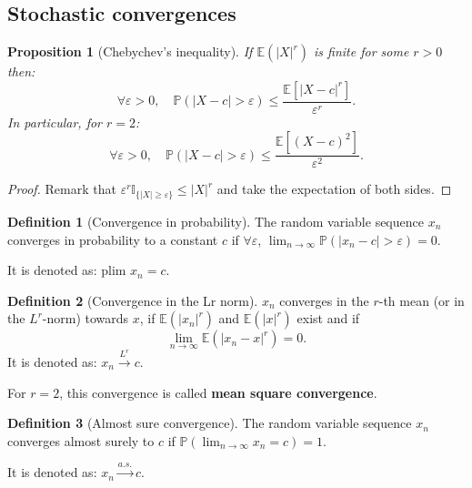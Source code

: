 \documentclass[
  12pt,
]{book}
\newtheorem{proposition}{Proposition}[chapter]
\theoremstyle{definition}
\newtheorem{definition}{Definition}[chapter]
\theoremstyle{definition}
\theoremstyle{definition}
\theoremstyle{definition}
\theoremstyle{remark}
\begin{document}
\hypertarget{stochastic-convergences}{%
\subsection{Stochastic convergences}\label{stochastic-convergences}}

\begin{proposition}[Chebychev's inequality]
\protect\hypertarget{prp:chebychev}{}\label{prp:chebychev}If \(\mathbb{E}(|X|^r)\) is finite for some \(r>0\) then:
\[
\forall \varepsilon > 0, \quad \mathbb{P}(|X - c|>\varepsilon) \le \frac{\mathbb{E}[|X - c|^r]}{\varepsilon^r}.
\]
In particular, for \(r=2\):
\[
\forall \varepsilon > 0, \quad \mathbb{P}(|X - c|>\varepsilon) \le \frac{\mathbb{E}[(X - c)^2]}{\varepsilon^2}.
\]
\end{proposition}

\begin{proof}
Remark that \(\varepsilon^r \mathbb{I}_{\{|X| \ge \varepsilon\}} \le |X|^r\) and take the expectation of both sides.
\end{proof}

\begin{definition}[Convergence in probability]
\protect\hypertarget{def:convergenceproba}{}\label{def:convergenceproba}The random variable sequence \(x_n\) converges in probability to a constant \(c\) if \(\forall \varepsilon\), \(\lim_{n \rightarrow \infty} \mathbb{P}(|x_n - c|>\varepsilon) = 0\).

It is denoted as: \(\mbox{plim } x_n = c\).
\end{definition}

\begin{definition}[Convergence in the Lr norm]
\protect\hypertarget{def:convergenceLr}{}\label{def:convergenceLr}\(x_n\) converges in the \(r\)-th mean (or in the \(L^r\)-norm) towards \(x\), if \(\mathbb{E}(|x_n|^r)\) and \(\mathbb{E}(|x|^r)\) exist and if
\[
\lim_{n \rightarrow \infty} \mathbb{E}(|x_n - x|^r) = 0.
\]
It is denoted as: \(x_n \overset{L^r}{\rightarrow} c\).

For \(r=2\), this convergence is called \textbf{mean square convergence}.
\end{definition}

\begin{definition}[Almost sure convergence]
\protect\hypertarget{def:convergenceAlmost}{}\label{def:convergenceAlmost}The random variable sequence \(x_n\) converges almost surely to \(c\) if \(\mathbb{P}(\lim_{n \rightarrow \infty} x_n = c) = 1\).

It is denoted as: \(x_n \overset{a.s.}{\rightarrow} c\).
\end{definition}
\end{document}
